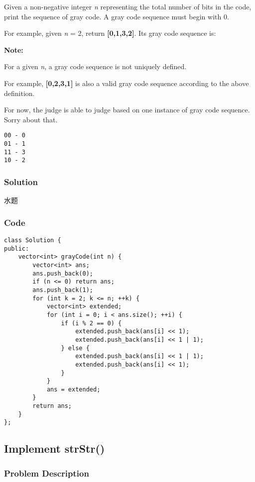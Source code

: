 \documentclass[courier]{article}
\begin{document}
\begin{CJK*}{UTF8}{gkai}
Given a non-negative integer \emph{n} representing the total number of bits in the code, print the sequence of gray code. A gray code sequence must begin with 0.

For example, given \emph{n} = 2, return \textbf{[0,1,3,2]}. Its gray code sequence is:

\textbf{Note:}


For a given \emph{n}, a gray code sequence is not uniquely defined.

For example, \textbf{[0,2,3,1]} is also a valid gray code sequence according to the above definition.

For now, the judge is able to judge based on one instance of gray code sequence. Sorry about that.

\begin{verbatim}
00 - 0
01 - 1
11 - 3
10 - 2
\end{verbatim}


\subsubsection*{Solution}
水题

\subsubsection*{Code}
\begin{lstlisting}
class Solution {
public:
    vector<int> grayCode(int n) {
        vector<int> ans;
        ans.push_back(0);
        if (n <= 0) return ans;
        ans.push_back(1);
        for (int k = 2; k <= n; ++k) {
            vector<int> extended;
            for (int i = 0; i < ans.size(); ++i) {
                if (i % 2 == 0) {
                    extended.push_back(ans[i] << 1);
                    extended.push_back(ans[i] << 1 | 1);
                } else {
                    extended.push_back(ans[i] << 1 | 1);
                    extended.push_back(ans[i] << 1);
                }
            }
            ans = extended;
        } 
        return ans;
    }
}; 
\end{lstlisting}


\subsection{ Implement strStr() }

\subsubsection*{Problem Description}



\end{CJK*}
\end{document}
